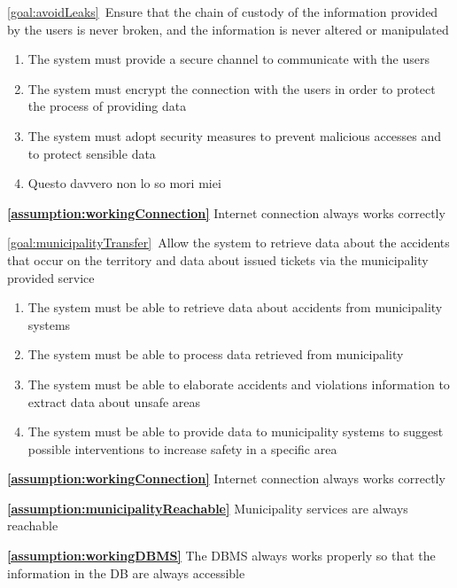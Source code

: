 \begin{description}
		\item \ref{goal:avoidLeaks}\ Ensure that the chain of custody of the information provided by the users is never broken, and the information is never altered or manipulated			
			\begin{enumerate}[resume*]
   				\item The system must provide a secure channel to communicate with the users
   				\item The system must encrypt the connection with the users in order to protect the process of providing data
   				\item The system must adopt security measures to prevent malicious accesses and to protect sensible data
   				\item Questo davvero non lo so mori miei
  			\end{enumerate}
			\textbf{\ref{assumption:workingConnection}} Internet connection always works correctly \newline
			
		\item \ref{goal:municipalityTransfer}\ Allow the system to retrieve data about the accidents that occur on the territory and data about issued tickets via the municipality provided service
			\begin{enumerate}[resume*]
   				\item The system must be able to retrieve data about accidents from municipality systems 
   				\item The system must be able to process data retrieved from municipality
   				\item The system must be able to elaborate accidents and violations information to extract data about unsafe areas
   				\item The system must be able to provide data to municipality systems to suggest possible interventions to increase safety in a specific area
  			\end{enumerate}
  			
  			\textbf{\ref{assumption:workingConnection}} Internet connection always works correctly
  			
			\textbf{\ref{assumption:municipalityReachable}} Municipality services are always reachable
			
  			\textbf{\ref{assumption:workingDBMS}} The DBMS always works properly so that the information in the DB are always accessible \newline
  			

\end{description}
